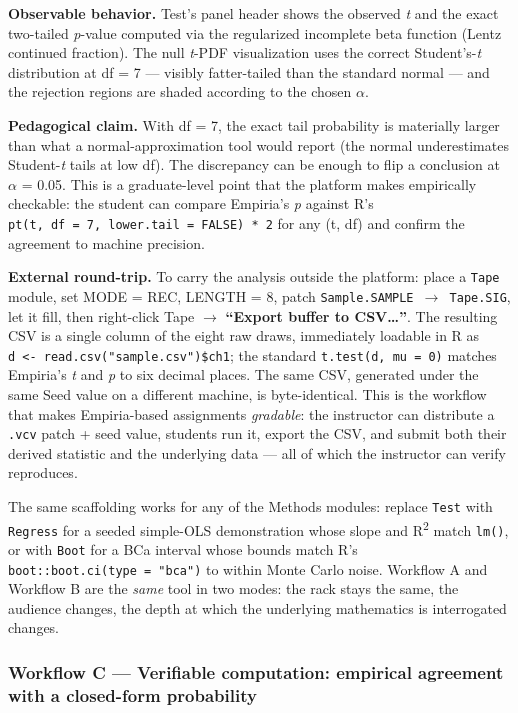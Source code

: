\textbf{Observable behavior.} Test's panel header shows the observed
\emph{t} and the exact two-tailed \emph{p}-value computed via the
regularized incomplete beta function (Lentz continued fraction). The
null \emph{t}-PDF visualization uses the correct Student's-\emph{t}
distribution at df = 7 --- visibly fatter-tailed than the standard
normal --- and the rejection regions are shaded according to the chosen
\ensuremath{\alpha}.

\textbf{Pedagogical claim.} With df = 7, the exact tail probability is
materially larger than what a normal-approximation tool would report
(the normal underestimates Student-\emph{t} tails at low df). The
discrepancy can be enough to flip a conclusion at \ensuremath{\alpha} = 0.05. This is a
graduate-level point that the platform makes empirically checkable: the
student can compare Empiria's \emph{p} against R's
\texttt{pt(t,\ df\ =\ 7,\ lower.tail\ =\ FALSE)\ *\ 2} for any (t, df)
and confirm the agreement to machine precision.

\textbf{External round-trip.} To carry the analysis outside the
platform: place a \texttt{Tape} module, set MODE = REC, LENGTH = 8,
patch \texttt{Sample.SAMPLE\ $\rightarrow$\ Tape.SIG}, let it fill, then right-click
Tape $\rightarrow$ \textbf{``Export buffer to CSV\ldots{}''}. The resulting CSV is a
single column of the eight raw draws, immediately loadable in R as
\texttt{d\ \textless{}-\ read.csv("sample.csv")\$ch1}; the standard
\texttt{t.test(d,\ mu\ =\ 0)} matches Empiria's \emph{t} and \emph{p} to
six decimal places. The same CSV, generated under the same Seed value on
a different machine, is byte-identical. This is the workflow that makes
Empiria-based assignments \emph{gradable}: the instructor can distribute
a \texttt{.vcv} patch + seed value, students run it, export the CSV, and
submit both their derived statistic and the underlying data --- all of
which the instructor can verify reproduces.

The same scaffolding works for any of the Methods modules: replace
\texttt{Test} with \texttt{Regress} for a seeded simple-OLS
demonstration whose slope and R\textsuperscript{2} match \texttt{lm()}, or with
\texttt{Boot} for a BCa interval whose bounds match R's
\texttt{boot::boot.ci(type\ =\ "bca")} to within Monte Carlo noise.
Workflow A and Workflow B are the \emph{same} tool in two modes: the
rack stays the same, the audience changes, the depth at which the
underlying mathematics is interrogated changes.

\subsubsection{Workflow C --- Verifiable computation: empirical
agreement with a closed-form
probability}\label{workflow-c-verifiable-computation-empirical-agreement-with-a-closed-form-probability}

